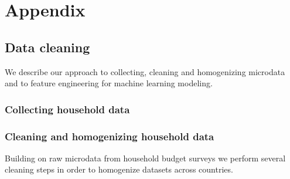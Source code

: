 \documentclass[12pt, a4paper]{article}
\begin{document}
\clearpage

\printbibliography

\clearpage

\appendix

\section{Appendix} \label{sec:appendix}

\subsection{Data cleaning} \label{sec:cleaning}

We describe our approach to collecting, cleaning and homogenizing microdata and to feature engineering for machine learning modeling.

\subsubsection{Collecting household data}



\subsubsection{Cleaning and homogenizing household data}

Building on raw microdata from household budget surveys we perform several cleaning steps in order to homogenize datasets across countries.
\end{document}
